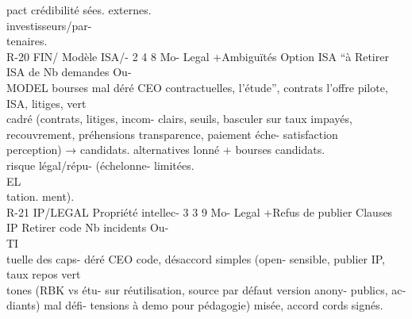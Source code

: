 pact crédibilité                                              sées.                              externes.\\
investisseurs/par-\\
tenaires.\\
R-20   FIN/      Modèle       ISA/- 2 4 8    Mo- Legal +Ambiguïtés        Option ISA “à Retirer ISA de Nb demandes Ou-\\
MODEL     bourses       mal           déré CEO   contractuelles, l’étude”, contrats l’offre     pilote, ISA,  litiges, vert\\
cadré (contrats,                       litiges,   incom- clairs,    seuils, basculer     sur taux impayés,\\
recouvrement,                          préhensions       transparence,      paiement éche- satisfaction\\
perception)     →                      candidats.        alternatives       lonné + bourses candidats.\\
risque légal/répu-                                      (échelonne-         limitées.\\
\vspace{0.5em}
\vspace{0.5em}
\vspace{0.5em}
\vspace{0.5em}
EL\\
tation.                                                  ment).\\
R-21   IP/LEGAL Propriété intellec- 3 3 9    Mo- Legal +Refus de publier Clauses          IP Retirer      code Nb incidents Ou-\\
\vspace{0.5em}
\vspace{0.5em}
\vspace{0.5em}
\vspace{0.5em}
TI\\
tuelle des caps-             déré CEO   code, désaccord simples       (open- sensible, publier IP, taux repos vert\\
tones (RBK vs étu-                      sur réutilisation, source par défaut version anony- publics,       ac-\\
diants) mal défi-                       tensions à demo pour pédagogie) misée,          accord cords signés.\\
\vspace{0.5em}
\vspace{0.5em}
\vspace{0.5em}
\vspace{0.5em}
